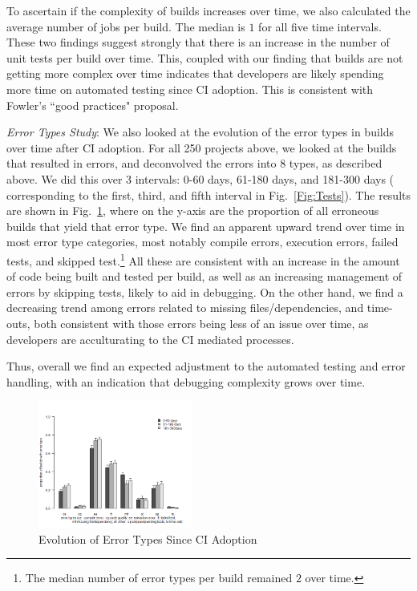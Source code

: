 To ascertain if the complexity of builds increases over time, we also calculated 
the average number of jobs per build.
The median is $1$ for all five time intervals.
These two findings suggest strongly that there is an increase in the number of 
unit tests per build over time.
This, coupled with our finding that builds are not getting more complex over time indicates that developers are likely spending more time on 
automated testing since CI adoption.
This is consistent with Fowler's ``good practices" proposal.



\smallskip\noindent \emph{Error Types Study}:
We also looked at the evolution of the error types in builds over time after CI 
adoption.
For all 250 projects above, we looked at the builds that resulted in errors, 
and deconvolved the errors into 8 types, as described above.
We did this over 3 intervals: 0-60 days, 61-180 days, and 181-300 days (\ie 
corresponding to the first, third, and fifth interval in Fig.~\ref{Fig:Tests}).
The results are shown in Fig.~\ref{Fig:BugTypes}, where on the y-axis are 
the proportion of all erroneous builds that yield that error type.
We find an apparent upward trend over time in most error type categories, 
most notably compile errors, execution errors, failed tests, and skipped 
test.\footnote{The median number of error types per build remained $2$ over 
time.}
All these are consistent with an increase in the amount of code being built 
and tested per build, as well as an increasing management of errors by 
skipping tests, likely to aid in debugging.
On the other hand, we find a decreasing trend among errors related to missing 
files/dependencies, and time-outs, both consistent with those errors being less 
of an issue over time, as developers are acculturating to the CI mediated 
processes.

Thus, overall we find an expected adjustment to the automated testing and 
error handling, with an indication that debugging complexity grows over time.



\begin{figure}[!t]
	\centering
	\includegraphics[width=0.45\textwidth, clip=true, trim=0 15 15 50]{new_plot_together.png}
	\caption{Evolution of Error Types Since CI Adoption}
	\label{Fig:BugTypes}
\end{figure}

